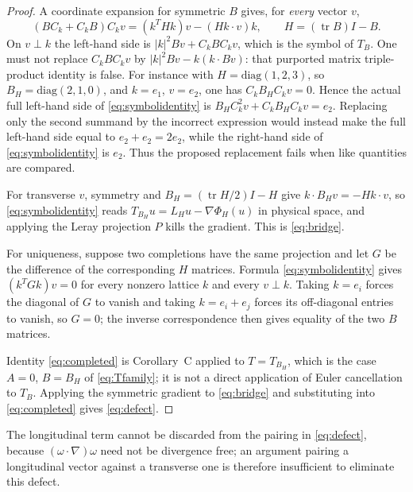 \documentclass[11pt]{article}
\theoremstyle{definition}
\theoremstyle{remark}
\theoremstyle{plain}
\DeclareMathOperator{\tr}{tr}
\newcommand{\Ck}{C_k}
\begin{document}
\begin{proof}
A coordinate expansion for symmetric $B$ gives, for \emph{every} vector $v$,
\begin{equation}
\label{eq:symbolidentity}
(B\Ck+\Ck B)\Ck v=(k^{T}Hk)v-(Hk\cdot v)k,
\qquad H=(\tr B)I-B .
\end{equation}
On $v\perp k$ the left-hand side is $|k|^{2}Bv+\Ck B\Ck v$, which is the
symbol of $T_{B}$. One must not replace $\Ck B\Ck v$ by
$|k|^{2}Bv-k(k\cdot Bv)$: that purported matrix triple-product identity is
false. For instance with $H=\mathrm{diag}(1,2,3)$, so
$B_{H}=\mathrm{diag}(2,1,0)$, and $k=e_{1}$, $v=e_{2}$, one has
$\Ck B_{H}\Ck v=0$. Hence the actual full left-hand side of
\eqref{eq:symbolidentity} is
$B_{H}\Ck^{2}v+\Ck B_{H}\Ck v=e_{2}$. Replacing only the second summand by
the incorrect expression would instead make the full left-hand side equal to
$e_{2}+e_{2}=2e_{2}$, while the right-hand side of
\eqref{eq:symbolidentity} is $e_{2}$. Thus the proposed replacement fails
when like quantities are compared.

For transverse $v$, symmetry and $B_{H}=(\tr H/2)I-H$ give
$k\cdot B_{H}v=-Hk\cdot v$, so \eqref{eq:symbolidentity} reads
$T_{B_{H}}u=L_{H}u-\nabla\Phi_{H}(u)$ in physical space, and applying the
Leray projection $P$ kills the gradient. This is \eqref{eq:bridge}.

For uniqueness, suppose two completions have the same projection and let $G$
be the difference of the corresponding $H$ matrices. Formula
\eqref{eq:symbolidentity} gives $(k^{T}Gk)v=0$ for every nonzero lattice $k$
and every $v\perp k$. Taking $k=e_{i}$ forces the diagonal of $G$ to vanish and
taking $k=e_{i}+e_{j}$ forces its off-diagonal entries to vanish, so $G=0$; the
inverse correspondence then gives equality of the two $B$ matrices.

Identity \eqref{eq:completed} is Corollary~C applied to
$T=T_{B_{H}}$, which is the case $A=0$, $B=B_{H}$ of \eqref{eq:Tfamily}; it is
not a direct application of Euler cancellation to $T_{B}$. Applying the
symmetric gradient to \eqref{eq:bridge} and substituting into
\eqref{eq:completed} gives \eqref{eq:defect}.
\end{proof}

The longitudinal term cannot be discarded from the pairing in
\eqref{eq:defect}, because $(\omega\cdot\nabla)\omega$ need not be divergence
free; an argument pairing a longitudinal vector against a transverse one is
therefore insufficient to eliminate this defect.
\end{document}
